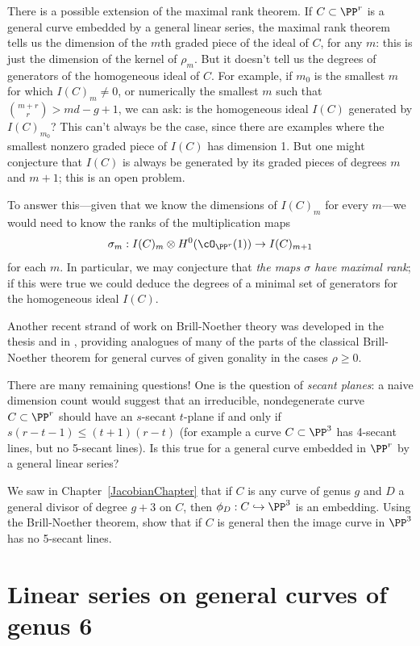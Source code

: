 There is a possible extension of the maximal rank theorem. If $C \subset \PP^r$ is a general curve embedded by a general linear series, the maximal rank theorem tells us the dimension of the $m$th graded piece of the ideal of $C$, for any $m$: this is just the dimension of the kernel of $\rho_m$. But it doesn't tell us the degrees of generators of the homogeneous ideal of $C$. For example, if $m_0$ is the smallest $m$ for which $I(C)_m \neq 0$, or numerically the smallest $m$ such that $\binom{m+r}{r} > md-g+1$, we can ask: is the homogeneous ideal $I(C)$ generated by $I(C)_{m_0}$? This can't always be the case, since 
there are examples where the  smallest nonzero graded piece of $I(C)$ has dimension 1. But one might conjecture that $I(C)$ is always be generated by its graded pieces of degrees $m$ and $m+1$; this is an open problem.

To answer this---given that we know the dimensions of $I(C)_m$ for every $m$---we would need to know the ranks of the multiplication maps
$$
\sigma_m : I(C)_m \otimes H^0(\cO_{\PP^r}(1)) \to I(C)_{m+1}
$$
for each $m$. In particular, we may conjecture that \emph{the maps $\sigma$ have maximal rank}; if this were true we could deduce the degrees of a minimal set of generators for the homogeneous ideal $I(C)$.

Another recent strand of work on Brill-Noether theory was developed in the thesis
\cite{HLarson} and in \cite{arXiv:2008.10765}, providing  analogues of many of the parts of the classical Brill-Noether theorem
for general curves of given gonality in the cases $\rho\geq 0$.


There are many remaining questions! One is the question of \emph{secant planes}: a naive dimension count would suggest that an irreducible, nondegenerate curve $C \subset \PP^r$ should have an $s$-secant $t$-plane if and only if $s(r-t-1) \leq (t+1)(r-t)$
(for example a curve $C \subset \PP^3$ has 4-secant lines, but no 5-secant lines). Is this true for a general curve embedded in $\PP^r$ by a general linear series?

\begin{exercise}
We saw in Chapter~\ref{JacobianChapter} that if $C$ is any curve of genus $g$ and $D$ a general divisor of degree $g+3$ on $C$, then $\phi_D : C \hookrightarrow \PP^3$ is an embedding. Using the Brill-Noether theorem, show that if $C$ is general then the image curve in $\PP^3$ has no 5-secant lines.
\end{exercise}

\section{Linear series on general curves of genus 6}\label{genus 6 section}\label{general genus 6}


